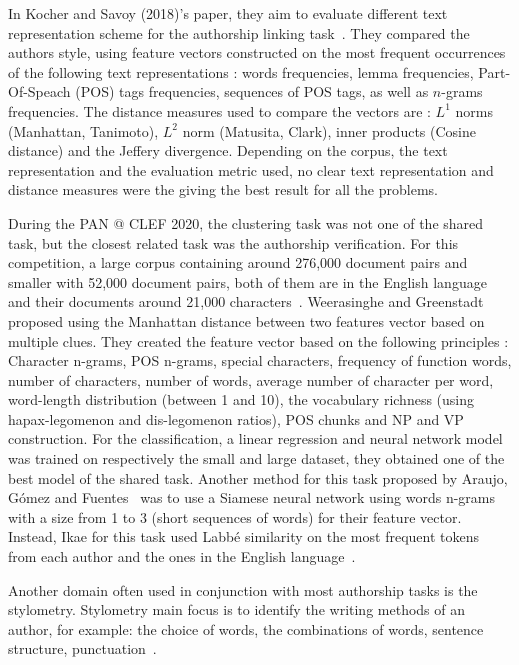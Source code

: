 In Kocher and Savoy (2018)'s paper, they aim to evaluate different text representation scheme for the authorship linking task~\cite{kocher_linking}.
They compared the authors style, using feature vectors constructed on the most frequent occurrences of the following text representations : words frequencies, lemma frequencies, Part-Of-Speach (POS) tags frequencies, sequences of POS tags, as well as $n$-grams frequencies.
The distance measures used to compare the vectors are : $L^1$ norms (Manhattan, Tanimoto), $L^2$ norm (Matusita, Clark), inner products (Cosine distance) and the Jeffery divergence.
Depending on the corpus, the text representation and the evaluation metric used, no clear text representation and distance measures were the giving the best result for all the problems.

During the PAN @ CLEF 2020, the clustering task was not one of the shared task, but the closest related task was the authorship verification.
For this competition, a large corpus containing around 276,000 document pairs and smaller with 52,000 document pairs, both of them are in the English language and their documents around 21,000 characters~\cite{overview_pan20}.
Weerasinghe and Greenstadt~\cite{feature_vector_pan20} proposed using the Manhattan distance between two features vector based on multiple clues.
They created the feature vector based on the following principles : Character n-grams, POS n-grams, special characters, frequency of function words, number of characters, number of words, average number of character per word, word-length distribution (between 1 and 10), the vocabulary richness (using hapax-legomenon and dis-legomenon ratios), POS chunks and NP and VP construction.
For the classification, a linear regression and neural network model was trained on respectively the small and large dataset, they obtained one of the best model of the shared task.
Another method for this task proposed by Araujo, Gómez and Fuentes~\cite{siamese_network_pan20} was to use a Siamese neural network using words n-grams with a size from 1 to 3 (short sequences of words) for their feature vector.
Instead, Ikae for this task used Labbé similarity on the most frequent tokens from each author and the ones in the English language~\cite{unine_pan20_verif}.

Another domain often used in conjunction with most authorship tasks is the stylometry.
Stylometry main focus is to identify the writing methods of an author, for example: the choice of words, the combinations of words, sentence structure, punctuation~\cite{savoy_stylo}.
